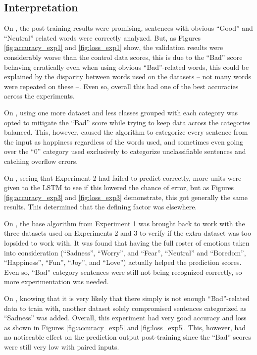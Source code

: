 \subsection{Interpretation}
On , the post-training results were promising, sentences with obvious ``Good'' and ``Neutral'' related words were correctly analyzed. But, as Figures \ref{fig:accuracy_exp1} and \ref{fig:loss_exp1} show, the validation results were considerably worse than the control data scores, this is due to the ``Bad'' score behaving erratically even when using obvious ``Bad''-related words, this could be explained by the disparity between words used on the datasets -- not many words were repeated on these --. Even so, overall this had one of the best accuracies across the experiments.

On , using one more dataset and less classes grouped with each category was opted to mitigate the ``Bad'' score while trying to keep data across the categories balanced. This, however, caused the algorithm to categorize every sentence from the input as happiness regardless of the words used, and sometimes even going over the ``0'' category used exclusively to categorize unclassifiable sentences and catching overflow errors.

On , seeing that Experiment 2 had failed to predict correctly, more units were given to the LSTM to see if this lowered the chance of error, but as Figures \ref{fig:accuracy_exp3} and \ref{fig:loss_exp3} demonstrate, this got generally the same results. This determined that the defining factor was elsewhere.

On , the base algorithm from Experiment 1 was brought back to work with the three datasets used on Experiments 2 and 3 to verify if the extra dataset was too lopsided to work with. It was found that having the full roster of emotions taken into consideration (``Sadness'', ``Worry'', and ``Fear'', ``Neutral'' and ``Boredom'', ``Happiness'', ``Fun'', ``Joy'', and ``Love'') actually helped the prediction scores. Even so, ``Bad'' category sentences were still not being recognized correctly, so more experimentation was needed.

On , knowing that it is very likely that there simply is not enough ``Bad''-related data to train with, another dataset solely compromised sentences categorized as ``Sadness'' was added. Overall, this experiment had very good accuracy and loss as shown in Figures \ref{fig:accuracy_exp5} and \ref{fig:loss_exp5}. This, however, had no noticeable effect on the prediction output post-training since the ``Bad'' scores were still very low with paired inputs.

